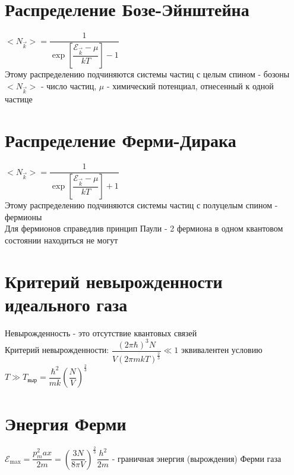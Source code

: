 \begin{multicols*}{2}
		\section{Распределение Бозе-Эйнштейна}
		$<N_{\vec{k}}> = \dfrac{1}{\exp\left[\dfrac{\mathcal{E}_{\vec{k}} - \mu}{kT}\right] - 1}$\\
		Этому распределению подчиняются системы частиц с целым спином - бозоны\\
		$<N_{\vec{k}}>$ - число частиц, $\mu$ - химический потенциал, отнесенный к одной частице\\

		\section{Распределение Ферми-Дирака}
		$<N_{\vec{k}}> = \dfrac{1}{\exp\left[\dfrac{\mathcal{E}_{\vec{k}} - \mu}{kT}\right] + 1}$\\
		Этому распределению подчиняются системы частиц с полуцелым спином - фермионы\\
		Для фермионов справедлив принцип Паули - 2 фермиона в одном квантовом состоянии находиться не могут\\

		\section{Критерий невырожденности идеального газа}
		Невырожденность - это отсутствие квантовых связей\\
		Критерий невырожденности: $\dfrac{(2\pi \hbar)^3 N}{V(2\pi mkT)^{\frac{2}{3}}} \ll 1$ эквивалентен условию $T\gg T_{\text{выр}} = \dfrac{\hbar^2}{mk} \left(\dfrac{N}{V}\right)^{\frac{2}{3}}$\\

		\section{Энергия Ферми}
		${\mathcal{E}}_{\text{max}} = \dfrac{p^2_max}{2m} = \left(\dfrac{3N}{8\pi V}\right)^{\frac{2}{3}}\dfrac{h^2}{2m}$ - граничная энергия (вырождения) Ферми газа\\
	\end{multicols*}

